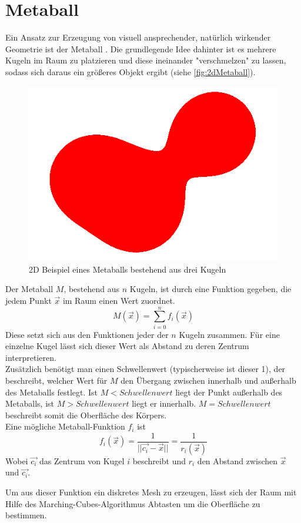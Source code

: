 \section{Metaball} \label{sec:metaball}
Ein Ansatz zur Erzeugung von visuell ansprechender, natürlich wirkender Geometrie ist der Metaball \cite{metaballArticle}.
Die grundlegende Idee dahinter ist es mehrere Kugeln im Raum zu platzieren und diese ineinander "verschmelzen" zu lassen, sodass sich daraus ein größeres Objekt ergibt (siehe \ref{fig:2dMetaball}).

\begin{figure}[ht]
    \centering
    \includegraphics[width=0.5\linewidth]{chapters/02_Grundlagen/Metaball/metaball_2d}
    \caption{2D Beispiel eines Metaballs bestehend aus drei Kugeln}\label{fig:2dMetaballl}
\end{figure}

Der Metaball $M$, bestehend aus $n$ Kugeln, ist durch eine Funktion gegeben, die jedem Punkt $\vec{x}$ im Raum einen Wert zuordnet.
\[M(\vec{x})=\sum_{i=0}^{n}f_i(\vec{x})\]
Diese setzt sich aus den Funktionen jeder der $n$ Kugeln zusammen. Für eine einzelne Kugel lässt sich dieser Wert als Abstand zu deren Zentrum interpretieren. \\
Zusätzlich benötigt man einen Schwellenwert (typischerweise ist dieser 1), der beschreibt, welcher Wert für $M$ den Übergang zwischen innerhalb und außerhalb des Metaballs festlegt.
Ist $M<Schwellenwert$ liegt der Punkt außerhalb des Metaballs, ist $M>Schwellenwert$ liegt er innerhalb. $M=Schwellenwert$ beschreibt somit die Oberfläche des Körpers.\\

Eine mögliche Metaball-Funktion $f_i$ ist
\[f_i(\vec{x}) = \frac{1}{||\vec{c_i}-\vec{x}||} = \frac{1}{r_i(\vec{x})}\]
Wobei $\vec{c_i}$ das Zentrum von Kugel $i$ beschreibt und $r_i$ den Abstand zwischen $\vec{x}$ und $\vec{c_i}$.

Um aus dieser Funktion ein diskretes Mesh zu erzeugen, lässt sich der Raum mit Hilfe des Marching-Cubes-Algorithmus Abtasten um die Oberfläche zu bestimmen.
